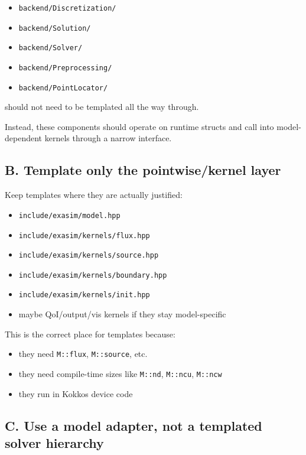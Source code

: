 \documentclass[11pt]{article}
\begin{document}
\begin{itemize}[leftmargin=*]
\item \texttt{backend/Discretization/}
\item \texttt{backend/Solution/}
\item \texttt{backend/Solver/}
\item \texttt{backend/Preprocessing/}
\item \texttt{backend/PointLocator/}
\end{itemize}

should not need to be templated all the way through.

Instead, these components should operate on runtime structs and call into model-dependent kernels through a narrow interface.

\subsection*{B. Template only the pointwise/kernel layer}

Keep templates where they are actually justified:

\begin{itemize}[leftmargin=*]
\item \texttt{include/exasim/model.hpp}
\item \texttt{include/exasim/kernels/flux.hpp}
\item \texttt{include/exasim/kernels/source.hpp}
\item \texttt{include/exasim/kernels/boundary.hpp}
\item \texttt{include/exasim/kernels/init.hpp}
\item maybe QoI/output/vis kernels if they stay model-specific
\end{itemize}

This is the correct place for templates because:

\begin{itemize}[leftmargin=*]
\item they need \texttt{M::flux}, \texttt{M::source}, etc.
\item they need compile-time sizes like \texttt{M::nd}, \texttt{M::ncu}, \texttt{M::ncw}
\item they run in Kokkos device code
\end{itemize}

\subsection*{C. Use a model adapter, not a templated solver hierarchy}
\end{document}
